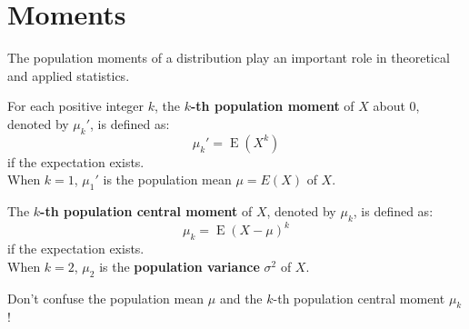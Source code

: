 \documentclass{huhtakm-template-book-v2}
\DeclareMathOperator{\E}{E}
\begin{document}
\section{Moments}
The population moments of a distribution play an important role in theoretical and applied statistics.
\begin{defn}
	For each positive integer $k$, the \textbf{$k$-th population moment} of $X$ about $0$, denoted by $\mu_{k}'$, is defined as:
	\begin{equation*}
		\mu_{k}'=\E(X^{k})
	\end{equation*}
	if the expectation exists.\\
	When $k=1$, $\mu_{1}'$ is the population mean $\mu=E(X)$ of $X$.
\end{defn}
\begin{defn}
	The \textbf{$k$-th population central moment} of $X$, denoted by $\mu_{k}$, is defined as:
	\begin{equation*}
		\mu_{k}=\E(X-\mu)^{k}
	\end{equation*}
	if the expectation exists.\\
	When $k=2$, $\mu_{2}$ is the \textbf{population variance} $\sigma^{2}$ of $X$.
\end{defn}
\begin{rem}
	Don't confuse the population mean $\mu$ and the $k$-th population central moment $\mu_{k}$!
\end{rem}
\end{document}
